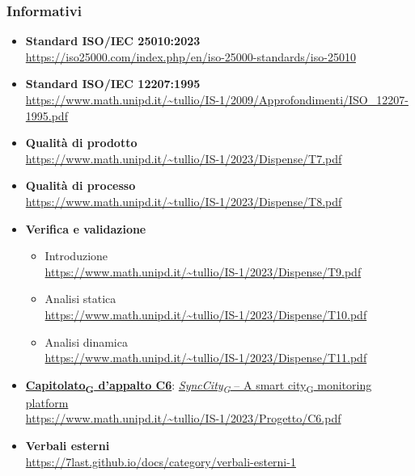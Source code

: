 \subsubsection{Informativi}
\begin{itemize}
    \item \textbf{Standard ISO/IEC 25010:2023} \\
        \url{https://iso25000.com/index.php/en/iso-25000-standards/iso-25010}
    \item \textbf{Standard ISO/IEC 12207:1995} \\
        \url{https://www.math.unipd.it/~tullio/IS-1/2009/Approfondimenti/ISO_12207-1995.pdf}
    \item \textbf{Qualità di prodotto} \\
        \url{https://www.math.unipd.it/~tullio/IS-1/2023/Dispense/T7.pdf}
    \item \textbf{Qualità di processo} \\
        \url{https://www.math.unipd.it/~tullio/IS-1/2023/Dispense/T8.pdf}
    \item \textbf{Verifica e validazione}
        \begin{itemize}
            \item Introduzione \\
                \url{https://www.math.unipd.it/~tullio/IS-1/2023/Dispense/T9.pdf}
            \item Analisi statica \\
                \url{https://www.math.unipd.it/~tullio/IS-1/2023/Dispense/T10.pdf}
            \item Analisi dinamica \\
                \url{https://www.math.unipd.it/~tullio/IS-1/2023/Dispense/T11.pdf}
        \end{itemize}
	\item \href{https://7last.github.io/docs/pb/documentazione-interna/glossario\#capitolato}{\textbf{Capitolato\textsubscript{G} d'appalto C6}}: \href{https://7last.github.io/docs/pb/documentazione-interna/glossario\#synccity}{\textit{SyncCity\textsubscript{G} } – A \href{https://7last.github.io/docs/pb/documentazione-interna/glossario\#smart-city}{smart city\textsubscript{G}} monitoring platform}\\
    \url{https://www.math.unipd.it/~tullio/IS-1/2023/Progetto/C6.pdf}
    \item \textbf{Verbali esterni} \\
        \url{https://7last.github.io/docs/category/verbali-esterni-1}

\end{itemize}
